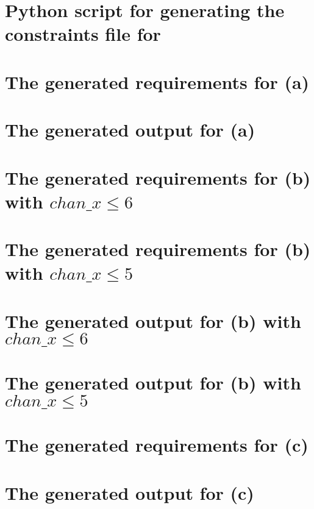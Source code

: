 \begin{appendices}
\chapter{Python script for generating the constraints file for }
\label{app:4_gen.py}


\chapter{The generated requirements for (a)}
\label{app:4_a_in}


\chapter{The generated output for (a)}
\label{app:4_a_out}


\chapter{The generated requirements for (b) with \texorpdfstring{$chan\_x \leq 6$}{leq6}}
\label{app:4_b1_in}


\chapter{The generated requirements for (b) with \texorpdfstring{$chan\_x \leq 5$}{leq5}}
\label{app:4_b2_in}


\chapter{The generated output for (b) with \texorpdfstring{$chan\_x \leq 6$}{leq6}}
\label{app:4_b1_out}


\chapter{The generated output for (b) with \texorpdfstring{$chan\_x \leq 5$}{leq5}}
\label{app:4_b2_out}


\chapter{The generated requirements for (c)}
\label{app:4_c_in}


\chapter{The generated output for (c)}
\label{app:4_c_out}

\end{appendices}